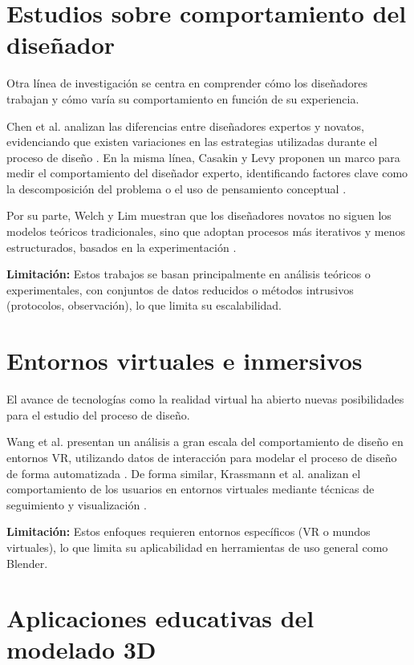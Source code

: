 \section{Estudios sobre comportamiento del diseñador}

Otra línea de investigación se centra en comprender cómo los diseñadores trabajan y cómo varía su comportamiento en función de su experiencia.

Chen et al. analizan las diferencias entre diseñadores expertos y novatos, evidenciando que existen variaciones en las estrategias utilizadas durante el proceso de diseño \cite{chen2022}. En la misma línea, Casakin y Levy proponen un marco para medir el comportamiento del diseñador experto, identificando factores clave como la descomposición del problema o el uso de pensamiento conceptual \cite{casakin2023}.

Por su parte, Welch y Lim muestran que los diseñadores novatos no siguen los modelos teóricos tradicionales, sino que adoptan procesos más iterativos y menos estructurados, basados en la experimentación \cite{welch}.

\textbf{Limitación:} Estos trabajos se basan principalmente en análisis teóricos o experimentales, con conjuntos de datos reducidos o métodos intrusivos (protocolos, observación), lo que limita su escalabilidad.

\section{Entornos virtuales e inmersivos}

El avance de tecnologías como la realidad virtual ha abierto nuevas posibilidades para el estudio del proceso de diseño.

Wang et al. presentan un análisis a gran escala del comportamiento de diseño en entornos VR, utilizando datos de interacción para modelar el proceso de diseño de forma automatizada \cite{wang2024}. De forma similar, Krassmann et al. analizan el comportamiento de los usuarios en entornos virtuales mediante técnicas de seguimiento y visualización \cite{krassmann2018}.

\textbf{Limitación:} Estos enfoques requieren entornos específicos (VR o mundos virtuales), lo que limita su aplicabilidad en herramientas de uso general como Blender.

\section{Aplicaciones educativas del modelado 3D}

